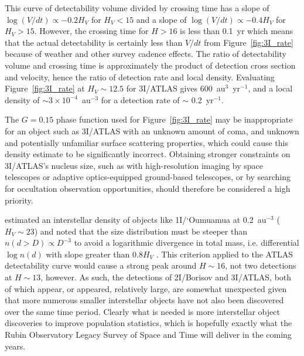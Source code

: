 \documentclass[linenumbers,twocolumn,longbib]{aastex7}
\begin{document}
This curve of detectability volume divided by crossing time has a slope of $\log(V/dt)\propto -0.2H_V$ for $H_V<15$ and a slope of $\log(V/dt)\propto -0.4H_V$ for $H_V>15$.  However, the crossing time for $H>16$ is less than 0.1~yr which means that the actual detectability is certainly less than $V/dt$ from Figure~\ref{fig:3I_rate} because of weather and other survey cadence effects.
The ratio of detectability volume and crossing time is approximately the product of detection cross section and velocity, hence the ratio of detection rate and local density.  Evaluating Figure~\ref{fig:3I_rate} at $H_V\sim12.5$ for 3I/ATLAS gives $600$~au$^3$~yr$^{-1}$, and a local density of $\sim3\times10^{-4}$~au$^{-3}$ for a detection rate of $\sim$ 0.2~yr$^{-1}$.


The $G=0.15$ phase function used for Figure~\ref{fig:3I_rate} may be inappropriate for an object such as 3I/ATLAS with an unknown amount of coma, and unknown and potentially unfamiliar surface scattering properties, which could cause this density estimate to be significantly incorrect.  Obtaining stronger constraints on 3I/ATLAS's nucleus size, such as with high-resolution imaging by space telescopes or adaptive optics-equipped ground-based telescopes, or by searching for occultation observation opportunities, should therefore be considered a high priority.


\cite{Do2018} estimated an interstellar density of objects like 1I/`Oumuamua at 0.2~au$^{-3}$ ($H_V\sim23$) and noted that the size distribution must be steeper than $n(d>D)\propto D^{-3}$ to avoid a logarithmic divergence in total mass, i.e. differential $\log n(d)$ with slope greater than $0.8H_V$ \citep[see Fig. 3 of ][]{Do2018}.  This criterion applied to the ATLAS detectability curve would cause a strong peak around $H\sim16$, not two detections at $H\sim13$, however.  As such, the detections of 2I/Borisov and 3I/ATLAS, both of which appear, or appeared, relatively large, are somewhat unexpected given that more numerous smaller interstellar objects have not also been discovered over the same time period.  Clearly what is needed is more interstellar object discoveries to improve population statistics, which is hopefully exactly what the Rubin Observatory Legacy Survey of Space and Time \citep[LSST;][]{jones2009_lsst} will deliver in the coming years.
\end{document}
